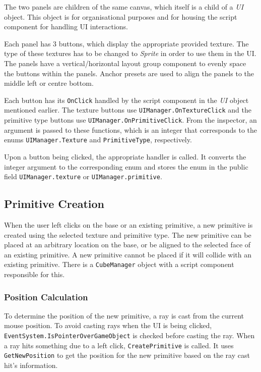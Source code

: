 \documentclass[a4paper, 12pt]{scrartcl}
\begin{document}
The two panels are children of the same canvas, which itself is a child of a \textit{UI} object. This object is for organisational purposes and for housing the script component for handling UI interactions.

Each panel has 3 buttons, which display the appropriate provided texture. The type of these textures has to be changed to \textit{Sprite} in order to use them in the UI. The panels have a vertical/horizontal layout group component to evenly space the buttons within the panels. Anchor presets are used to align the panels to the middle left or centre bottom.

Each button has its \texttt{OnClick} handled by the script component in the \textit{UI} object mentioned earlier. The texture buttons use \texttt{UIManager.OnTextureClick} and the primitive type buttons use \texttt{UIManager.OnPrimitiveClick}. From the inspector, an argument is passed to these functions, which is an integer that corresponds to the enums \texttt{UIManager.Texture} and \texttt{PrimitiveType}, respectively.

Upon a button being clicked, the appropriate handler is called. It converts the integer argument to the corresponding enum and stores the enum in the public field \texttt{UIManager.texture} or \texttt{UIManager.primitive}.

\subsection{Primitive Creation}
When the user left clicks on the base or an existing primitive, a new primitive is created using the selected texture and primitive type. The new primitive can be placed at an arbitrary location on the base, or be aligned to the selected face of an existing primitive. A new primitive cannot be placed if it will collide with an existing primitive. There is a \texttt{CubeManager} object with a script component responsible for this.

\subsubsection{Position Calculation}
To determine the position of the new primitive, a ray is cast from the current mouse position. To avoid casting rays when the UI is being clicked, \texttt{EventSystem.IsPointerOver\-GameObject} is checked before casting the ray. When a ray hits something due to a left click, \texttt{CreatePrimitive} is called. It uses \texttt{GetNewPosition} to get the position for the new primitive based on the ray cast hit's information.
\end{document}
